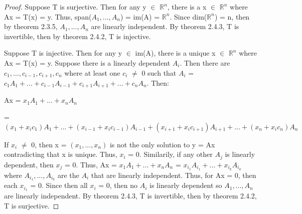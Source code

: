     \begin{proof}
        Suppose T is surjective.
        Then for any y $\in$ $\mathbb{R}^n$,
        there is a x $\in$ $\mathbb{R}^n$ where
        Ax = T(x) = y.
        Thus, span($A_1,...,A_n$) = im(A) = $\mathbb{R}^n$.
        Since dim($\mathbb{R}^n$) = n, then by {\color{red} theorem 2.3.5},
        $A_1,...,A_n$ are linearly independent.
        By {\color{red} theorem 2.4.3}, T is invertible,
        then by {\color{red} theorem 2.4.2}, T is injective.

        \vspace{0.2cm}

        Suppose T is injective.
        Then for any y $\in$ im(A),
        there is a unique x $\in$ $\mathbb{R}^n$ where
        Ax = T(x) = y.
        Suppose there is a linearly dependent $A_i$.
        Then there are $c_1,...,c_{i-1},c_{i+1},c_n$ where
        at least one $c_i$ $\not =$ 0 such that
        $A_i$ = $c_1A_1 + ... + c_{i-1}A_{i-1} + c_{i+1}A_{i+1} + ... + c_nA_n$.
        Then:

        \hspace{0.5cm}
        Ax
        = $x_1A_1 + ... + x_nA_n$

        \hspace{1.15cm}
        = $(x_1 + x_ic_1)A_1 + ... + (x_{i-1} + x_ic_{i-1})A_{i-1}
            + (x_{i+1} + x_ic_{i+1})A_{i+1} + ... + (x_n + x_ic_n)A_n$

        If $x_i$ $\not =$ 0, then x = $(x_1,...,x_n)$
        is not the only solution to y = Ax contradicting that x is unique.
        Thus, $x_i$ = 0. Similarily, if any other $A_j$ is linearly dependent,
        then $x_j$ = 0. Thus, Ax = $x_1A_1 + ... + x_nA_n$
        = $x_{i_1}A_{i_1} + ... + x_{i_k}A_{i_k}$
        where $A_{i_1},...,A_{i_k}$ are the $A_i$ that are linearly independent.
        Thus, for Ax = 0, then each $x_{i_1}$ = 0.
        Since then all $x_i$ = 0, then no $A_i$ is linearly dependent
        so $A_1,...,A_n$ are linearly independent.
        By {\color{red} theorem 2.4.3}, T is invertible,
        then by {\color{red} theorem 2.4.2}, T is surjective.
    \end{proof}

    \vspace{0.5cm}



